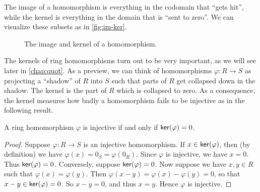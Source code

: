 The image of a homomorphism is everything in the codomain that ``gets hit'', while the kernel is everything in the domain that is ``sent to zero''.
We can visualize these subsets as in \autoref{fig:im-ker}.
\begin{figure}[h!]
\begin{center}
\caption{The image and kernel of a homomorphism. \label{fig:im-ker}}
\end{center}
\end{figure}
The kernels of ring homomorphisms turn out to be very important, as we will see later in \autoref{chap:quot}.
As a preview, we can think of homomorphisms \(\varphi : R \rightarrow S\) as projecting a ``shadow'' of \(R\) into \(S\) such that parts of \(R\) get collapsed down in the shadow.
The kernel is the part of \(R\) which is collapsed to zero.
As a consequence, the kernel measures how badly a homomorphism fails to be injective as in the following result.

\begin{prop} \label{prop:ker-zero}
A ring homomorphism \(\varphi\) is injective if and only if \( \mathsf{ker}(\varphi)  = 0\).
\end{prop}

\begin{proof}
Suppose \(\varphi : R \rightarrow S\) is an injective homomorphism. If \(x \in  \mathsf{ker}(\varphi) \), then (by definition) we have \(\varphi(x) = 0_S = \varphi(0_R)\). Since \(\varphi\) is injective, we have \(x = 0\). Thus \( \mathsf{ker}(\varphi)  = 0\). Conversely, suppose \( \mathsf{ker}(\varphi)  = 0\). Now suppose we have \(x,y \in R\) such that \(\varphi(x) = \varphi(y)\). Then \(\varphi(x - y) = \varphi(x) - \varphi(y) = 0\), so that \(x-y \in  \mathsf{ker}(\varphi)  = 0\). So \(x-y = 0\), and thus \(x = y\). Hence \(\varphi\) is injective.
\end{proof}

